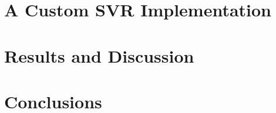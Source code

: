 \documentclass[12pt]{report}
\begin{document}

\chapter{A Custom SVR Implementation}
\label{chcustsvr}

\chapter{Results and Discussion}
\label{chres}

\chapter*{Conclusions}
\label{concl}

%
%
 

% 
\end{document}
